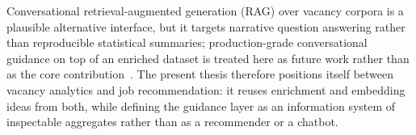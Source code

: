 Conversational retrieval-augmented generation (RAG) over vacancy corpora is a plausible alternative interface, but it targets narrative question answering rather than reproducible statistical summaries; production-grade conversational guidance on top of an enriched dataset is treated here as future work rather than as the core contribution~\cite{Gao2023}.
The present thesis therefore positions itself between vacancy analytics and job recommendation: it reuses enrichment and embedding ideas from both, while defining the guidance layer as an information system of inspectable aggregates rather than as a recommender or a chatbot.
